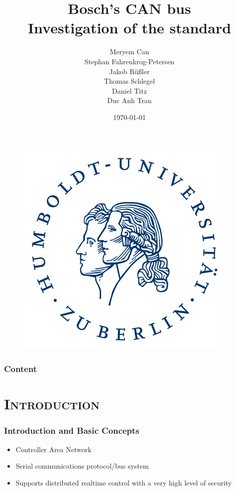 \documentclass[xcolor=x11names,compress]{beamer}
\renewcommand{\(}{\begin{columns}}
\renewcommand{\)}{\end{columns}}
\newcommand{\<}[1]{\begin{column}{#1}}
\renewcommand{\>}{\end{column}}
\begin{document}
\begin{frame}[plain]
  \begin{figure}
    \flushright
      \includegraphics[scale=0.12]{hu_logo}
    \vspace*{-0.4cm}
  \end{figure}

  \title{\textbf{Bosch's CAN bus\\Investigation of the standard}\\\vspace{0.2cm}}

  \author{Meryem Can\\Stephan Fahrenkrog-Petersen\\Jakob Rüßler\\Thomas Schlegel\\
  Daniel Titz\\Duc Anh Tran\\\vspace{0.3cm}}


\date{\today}
\titlepage
\end{frame}

\begin{frame}
\frametitle{Content}
\tableofcontents[]
\end{frame}

\section{\scshape Introduction}
\begin{frame}
  \frametitle{Introduction and Basic Concepts}
  \begin{itemize}
      \item Controller Area Network~\cite{can}
      \item Serial communications protocol/bus system
      \item Supports distributed realtime control with a very high level of security 
   
  \end{itemize}

\end{frame}
\end{document}
